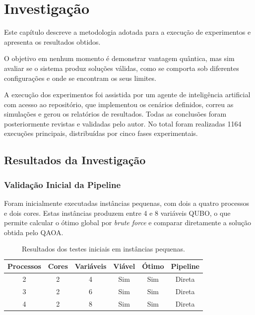 \chapter{Investigação}
\label{chap:investigacao}
\label{chap:resultados-discussao}

Este capítulo descreve a metodologia adotada para a execução de experimentos e apresenta os resultados
obtidos. 

O objetivo em nenhum momento é demonstrar
vantagem quântica, mas sim avaliar se o sistema produz soluções válidas, como se comporta
sob diferentes configurações e onde se encontram os seus limites.

A execução dos experimentos foi assistida por um agente de inteligência artificial 
com acesso ao repositório, que implementou os cenários definidos, correu as 
simulações e gerou os relatórios de resultados. Todas as conclusões foram 
posteriormente revistas e validadas pelo autor. No total foram realizadas 1164
execuções principais, distribuídas por cinco fases experimentais.


\clearpage
\section{Resultados da Investigação}

\subsection{Validação Inicial da Pipeline}

Foram inicialmente executadas instâncias pequenas, com dois a quatro processos e dois
cores. Estas instâncias produzem entre 4 e 8 variáveis QUBO, o que permite calcular o
ótimo global por \textit{brute force} e comparar diretamente a solução obtida pelo QAOA.

\begin{table}[H]
\centering
\begin{tabular}{|c|c|c|c|c|c|}
\hline
\textbf{Processos} & \textbf{Cores} & \textbf{Variáveis} & \textbf{Viável} & \textbf{Ótimo} & \textbf{Pipeline} \\
\hline
2 & 2 & 4 & Sim & Sim & Direta \\
3 & 2 & 6 & Sim & Sim & Direta \\
4 & 2 & 8 & Sim & Sim & Direta \\
\hline
\end{tabular}
\caption{Resultados dos testes iniciais em instâncias pequenas.}
\label{tab:resultados-sanity}
\end{table}

